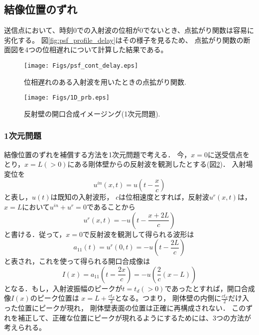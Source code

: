 \documentclass[10pt,a4j,dvipdfmx]{jarticle}
\begin{document}
\subsection{結像位置のずれ}
送信点において、時刻0での入射波の位相が0でないとき、点拡がり関数は容易に劣化する。
図\ref{fig:psf_profile_delay}はその様子を見るため、
点拡がり関数の断面図を4つの位相遅れについて計算した結果である。
\begin{figure}[h]
	\begin{center}
	\texttt{[image: Figs/psf\_cont\_delay.eps]} 
	\end{center}
	\caption{位相遅れのある入射波を用いたときの点拡がり関数.} 
	\label{fig:psf_cont_delay}
\end{figure}
\begin{figure}[h]
	\begin{center}
	\texttt{[image: Figs/1D\_prb.eps]} 
	\end{center}
	\caption{反射壁の開口合成イメージング(1次元問題).} 
	\label{fig:1D_prb}
\end{figure}
\subsubsection{1次元問題}
結像位置のずれを補償する方法を1次元問題で考える．
今，$x=0$に送受信点をとり，$x=L(>0)$にある剛体壁からの反射波を観測したとする(図\ref{fig:1D_prb})．
入射場変位を
\begin{equation}
	u^{in}(x,t)=u\left(t-\frac{x}{c}\right)
	\label{eqn:uin_1D}
\end{equation}
と表し，$u(t)$は既知の入射波形，
$c$は位相速度とすれば，反射波$u^{r}(x,t)$は，$x=L$において$u^{in}+u^{r}=0$であることから
\begin{equation}
	u^{r}(x,t)=-u\left(t-\frac{x+2L}{c}\right)
	\label{eqn:ur_1D}
\end{equation}
と書ける．従って，$x=0$で反射波を観測して得られる波形は
\begin{equation}
	a_{11}(t)=u^{r}(0,t)=-u\left( t-\frac{2L}{c}\right)
	\label{eqn:}
\end{equation}
と表され，これを使って得られる開口合成像は
\begin{equation}
	I(x)=
	a_{11}\left(t=\frac{2x}{c}\right)
	=
	-u\left(\frac{2}{c}(x-L)\right)
	\label{eqn:}
\end{equation}
となる．もし，入射波振幅のピークが$t=t_d(>0)$であったとすれば，開口合成像$I(x)$のピーク位置は
$x=L+\frac{ct_d}{2}$となる。つまり，
剛体壁の内側に$\frac{ct_d}{2}$だけ入った位置にピークが現れ，
剛体壁表面の位置は正確に再構成されない．
このずれを補正して、正確な位置にピークが現れるようにするためには、3つの方法が考えられる。
\end{document}
